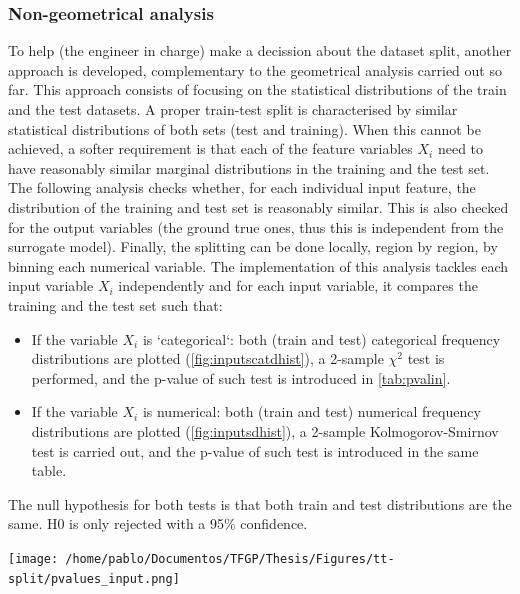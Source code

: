 \subsubsection{Non-geometrical analysis}
\indent To help (the engineer in charge) make a decission about the dataset split, another approach is developed, complementary to the geometrical analysis carried out so far. This approach consists of focusing on the statistical distributions of the train and the test datasets. A proper train-test split is characterised by similar statistical distributions of both sets (test and training)\cite{bonnasse2022interpolation}. When this cannot be achieved, a softer requirement is that each of the feature variables $X_i$ need to have reasonably similar marginal distributions in the training and the test set.\\
%
\indent The following analysis checks whether, for each individual input feature, the distribution of the training and test set is reasonably similar. This is also checked for the output variables (the ground true ones, thus this is independent from the surrogate model). Finally, the splitting can be done locally, \ie region by region, by binning each numerical variable. The implementation of this analysis tackles each input variable $X_i$ independently and for each input variable, it compares the training and the test set such that:
\begin{itemize}
	\item If the variable $X_i$ is `categorical`: both (train and test) categorical frequency distributions are plotted (\autoref{fig:inputscatdhist}), a 2-sample $\chi^2$ test\cite[p. 431]{velez1994calculo} is performed, and the p-value of such test is introduced in \autoref{tab:pvalin}.
	\item If the variable $X_i$ is numerical: both (train and test) numerical frequency distributions are plotted (\autoref{fig:inputsdhist}), a 2-sample Kolmogorov-Smirnov test\cite[p. 454]{velez1994calculo} is carried out, and the p-value of such test is introduced in the same table.\\
\end{itemize}
%
\indent The null hypothesis for both tests is that both train and test distributions are the same. H0 is only rejected with a 95\% confidence.\\
%
\begin{table}[!htb]
	\centering
	\label{tab:pvalin}
	\texttt{[image: /home/pablo/Documentos/TFGP/Thesis/Figures/tt-split/pvalues\_input.png]}
\end{table}
